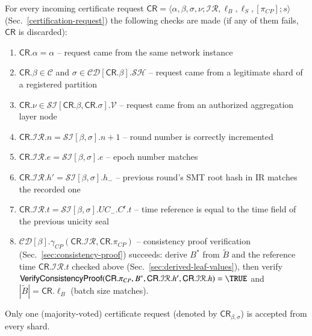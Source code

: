 For every incoming certificate request $\mathsf{CR}=\langle \alpha, \beta, \sigma, \nu; \mathcal{IR}, \ell_B, \ell_S, [\pi_{CP}]; s \rangle$ (Sec.~\ref{certification-request}) the following checks are made
(if any of them fails, $\mathsf{CR}$ is discarded):
\begin{enumerate}
\item $\mathsf{CR}.\alpha = \alpha$ -- request came from the same network instance
\item $\mathsf{CR}.\beta\in \mathcal{C}$ and $\sigma\in \mathcal{CD}[\mathsf{CR}.\beta].\mathcal{SH}$ -- request came from a legitimate shard of a registered partition
\item $\mathsf{CR}.\nu\in \mathcal{SI}[\mathsf{CR}.\beta, \mathsf{CR}.\sigma].\mathcal{V}$ -- request came from an authorized aggregation layer node
\item $\mathsf{CR}.\mathcal{IR}.n=\mathcal{SI}[\beta,\sigma].n + 1$ -- round number is correctly incremented
\item $\mathsf{CR}.\mathcal{IR}.e=\mathcal{SI}[\beta,\sigma].e$ -- epoch number matches
\item $\mathsf{CR}.\mathcal{IR}.h'=\mathcal{SI}[\beta,\sigma].h_-$ -- previous round's SMT root hash in IR matches the recorded one
\item $\mathsf{CR}.\mathcal{IR}.t = \mathcal{SI}[\beta, \sigma].UC_-.C^\mathsf{r}.t$ -- time reference is equal to the time field of the previous unicity seal
	\item $\mathcal{CD}[\beta].\gamma_{CP}(\mathsf{CR}.\mathcal{IR}, \mathsf{CR}.\pi_{CP})$ -- consistency proof verification (Sec.~\ref{sec:consistency-proof}) succeeds: derive $B^{*}$ from $\widetilde B$ and the reference time $\mathsf{CR}.\mathcal{IR}.t$ checked above (Sec.~\ref{sec:derived-leaf-values}), then verify $\mathsf{VerifyConsistencyProof}(\mathsf{CR}.\pi_{CP}, B^{*}, \mathsf{CR}.\mathcal{IR}.h', \mathsf{CR}.\mathcal{IR}.h) = \TRUE$ and $|\widetilde B| = \mathsf{CR}.\ell_B$ (batch size matches).
\end{enumerate}
Only one (majority-voted) certificate request (denoted by $\mathsf{CR}_{\beta,\sigma}$) is accepted from every shard.


